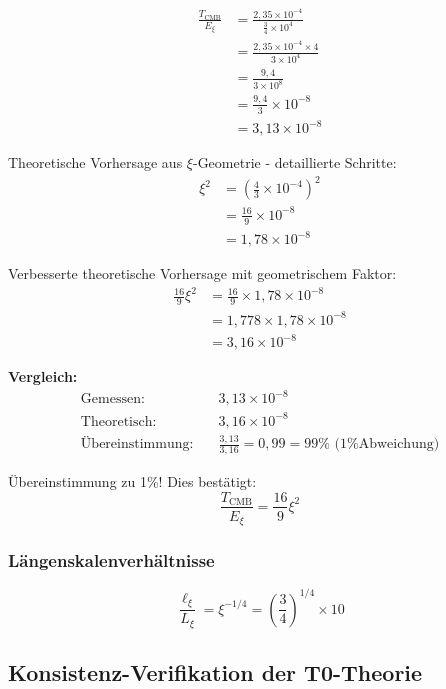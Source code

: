 \documentclass[12pt,a4paper]{article}
\theoremstyle{definition}
\theoremstyle{remark}
\begin{document}
	\begin{align}
		\frac{T_{\text{CMB}}}{E_\xi} &= \frac{2,35 \times 10^{-4}}{\frac{3}{4} \times 10^4} \\
		&= \frac{2,35 \times 10^{-4} \times 4}{3 \times 10^4} \\
		&= \frac{9,4}{3 \times 10^8} \\
		&= \frac{9,4}{3} \times 10^{-8} \\
		&= 3,13 \times 10^{-8}
	\end{align}
	
	Theoretische Vorhersage aus $\xi$-Geometrie - detaillierte Schritte:
	\begin{align}
		\xi^2 &= \left(\frac{4}{3} \times 10^{-4}\right)^2 \\
		&= \frac{16}{9} \times 10^{-8} \\
		&= 1,78 \times 10^{-8}
	\end{align}
	
	Verbesserte theoretische Vorhersage mit geometrischem Faktor:
	\begin{align}
		\frac{16}{9}\xi^2 &= \frac{16}{9} \times 1,78 \times 10^{-8} \\
		&= 1,778 \times 1,78 \times 10^{-8} \\
		&= 3,16 \times 10^{-8}
	\end{align}
	
	\textbf{Vergleich:}
	\begin{align}
		\text{Gemessen:} \quad &3,13 \times 10^{-8} \\
		\text{Theoretisch:} \quad &3,16 \times 10^{-8} \\
		\text{\"Ubereinstimmung:} \quad &\frac{3,13}{3,16} = 0,99 = 99\% \text{ (1\% Abweichung)}
	\end{align}
	
	\"Ubereinstimmung zu 1\%! Dies best\"atigt:
	\begin{equation}
		\boxed{\frac{T_{\text{CMB}}}{E_\xi} = \frac{16}{9}\xi^2}
	\end{equation}
	
	\subsubsection{L\"angenskalenverh\"altnisse}
	
	\begin{equation}
		\frac{\ell_{\xi}}{L_\xi} = \xi^{-1/4} = \left(\frac{3}{4}\right)^{1/4} \times 10
	\end{equation}
	
	\subsection{Konsistenz-Verifikation der T0-Theorie}
	
\end{document}
